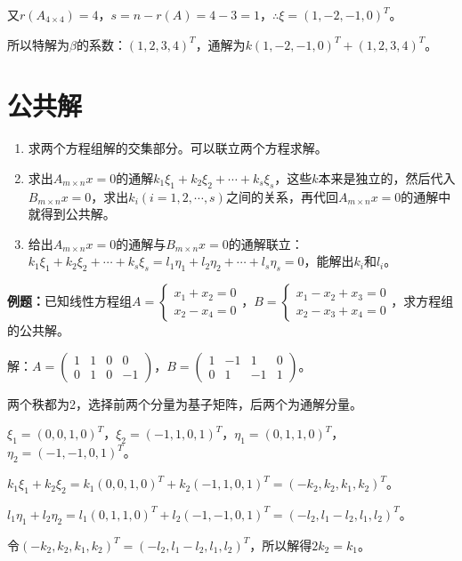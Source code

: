 \documentclass[UTF8, 12pt]{ctexart}
\begin{document}
又$r(A_{4\times4})=4$，$s=n-r(A)=4-3=1$，$\therefore\xi=(1,-2,-1,0)^T$。

所以特解为$\beta$的系数：$(1,2,3,4)^T$，通解为$k(1,-2,-1,0)^T+(1,2,3,4)^T$。

\section{公共解}

\begin{enumerate}
    \item 求两个方程组解的交集部分。可以联立两个方程求解。
    \item 求出$A_{m\times n}x=0$的通解$k_1\xi_1+k_2\xi_2+\cdots+k_s\xi_s$，这些$k$本来是独立的，然后代入$B_{m\times n}x=0$，求出$k_i(i=1,2,\cdots,s)$之间的关系，再代回$A_{m\times n}x=0$的通解中就得到公共解。
    \item 给出$A_{m\times n}x=0$的通解与$B_{m\times n}x=0$的通解联立：$k_1\xi_1+k_2\xi_2+\cdots+k_s\xi_s=l_1\eta_1+l_2\eta_2+\cdots+l_s\eta_s=0$，能解出$k_i$和$l_i$。
\end{enumerate}

\textbf{例题：}已知线性方程组$A=\left\{\begin{array}{l}
    x_1+x_2=0 \\
    x_2-x_4=0
\end{array}\right.$，$B=\left\{\begin{array}{l}
    x_1-x_2+x_3=0 \\
    x_2-x_3+x_4=0
\end{array}\right.$，求方程组的公共解。

解：$A=\left(\begin{array}{cccc}
    1 & 1 & 0 & 0 \\
    0 & 1 & 0 & -1
\end{array}\right)$，$B=\left(\begin{array}{cccc}
    1 & -1 & 1 & 0 \\
    0 & 1 & -1 & 1
\end{array}\right)$。\medskip

两个秩都为2，选择前两个分量为基子矩阵，后两个为通解分量。

$\xi_1=(0,0,1,0)^T$，$\xi_2=(-1,1,0,1)^T$，$\eta_1=(0,1,1,0)^T$，$\eta_2=(-1,-1,0,1)^T$。

$k_1\xi_1+k_2\xi_2=k_1(0,0,1,0)^T+k_2(-1,1,0,1)^T=(-k_2,k_2,k_1,k_2)^T$。

$l_1\eta_1+l_2\eta_2=l_1(0,1,1,0)^T+l_2(-1,-1,0,1)^T=(-l_2,l_1-l_2,l_1,l_2)^T$。

令$(-k_2,k_2,k_1,k_2)^T=(-l_2,l_1-l_2,l_1,l_2)^T$，所以解得$2k_2=k_1$。
\end{document}
